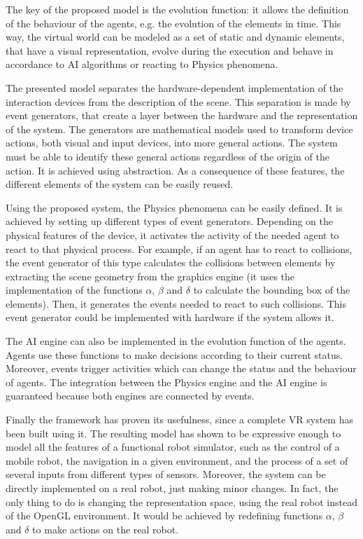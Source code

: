 \documentclass{aamas2012}
\begin{document}
The key of the proposed model is the evolution function: it allows the definition of the behaviour of the agents, e.g.  the evolution of the elements in time. This way, the virtual world can be modeled as a set of static and dynamic elements, that have a visual representation, evolve during the execution and behave in accordance to AI algorithms or reacting to Physics phenomena.

The presented model separates the hardware-dependent implementation of the interaction devices from the description of the scene. This separation is made by event generators, that create a layer between the hardware and the representation of the system. The generators are mathematical models used to transform device actions, both visual and input devices, into more general actions. The
system must be able to identify these general actions regardless of the origin of the action. It is
achieved using abstraction. As a consequence of these features, the different elements of the system can be easily reused.

Using the proposed system, the Physics phenomena can be easily defined. It is achieved by setting up different types of event generators. Depending on the
physical features of the device, it activates the activity of the needed agent to react to that
physical process. For example, if an agent has to react to collisions, the event generator of this
type calculates the collisions between elements by extracting the scene geometry from the graphics
engine (it uses the implementation of the functions $\alpha$, $\beta$ and $\delta$ to calculate the
bounding box of the elements). Then, it generates the events needed to react to such collisions.
This event generator could be implemented with hardware if the system allows it.

The AI engine can also be implemented in the evolution function of the agents. Agents use these
functions to make decisions according to their current status. Moreover, events trigger activities
which can change the status and the behaviour of agents. The integration between the Physics engine
and the AI engine is guaranteed because both engines are connected by events.

Finally the framework has proven its usefulness, since a complete VR system has been built using it. The resulting model has shown to be expressive enough to model all the features of a functional robot simulator, such as the control of a mobile robot, the navigation in a given environment, and the process of a set of several inputs from different types of sensors. Moreover, the system can be directly implemented on a real robot, just making minor changes. In fact, the only thing to do is changing the representation space, using the real robot instead of the OpenGL environment. It would be achieved by redefining functions $\alpha$, $\beta$ and $\delta$ to make actions on the real robot.
\end{document}
